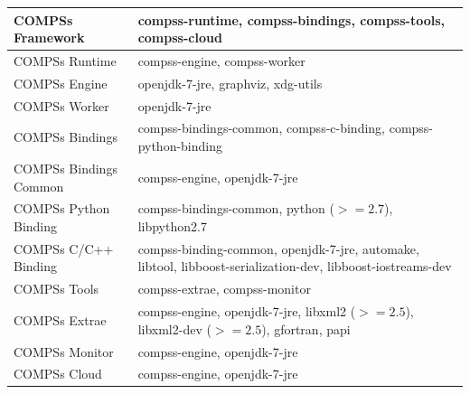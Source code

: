 \bgroup
  \def\arraystretch{1.5}
  \begin{center}
    \begin{tabular}{ p{6cm} | p{10cm} }
    COMPSs Framework 		& compss-runtime, compss-bindings, compss-tools, compss-cloud \\ \hline 
    COMPSs Runtime 		& compss-engine, compss-worker \\ \hline  
    COMPSs Engine 		& openjdk-7-jre, graphviz, xdg-utils \\ \hline 
    COMPSs Worker 		& openjdk-7-jre \\ \hline 
    COMPSs Bindings 		& compss-bindings-common, compss-c-binding, compss-python-binding \\ \hline 
    COMPSs Bindings Common 	& compss-engine, openjdk-7-jre \\ \hline 
    COMPSs Python Binding 	& compss-bindings-common, python ($>= 2.7$), libpython2.7 \\ \hline 
    COMPSs C/C++ Binding 	& compss-binding-common, openjdk-7-jre, automake, libtool, libboost-serialization-dev, libboost-iostreams-dev \\ \hline 
    COMPSs Tools 		& compss-extrae, compss-monitor \\ \hline 
    COMPSs Extrae 		& compss-engine, openjdk-7-jre, libxml2 ($>= 2.5$), libxml2-dev ($>= 2.5$), gfortran, papi \\ \hline 
    COMPSs Monitor 		& compss-engine, openjdk-7-jre \\ \hline 
    COMPSs Cloud 		& compss-engine, openjdk-7-jre    
    \end{tabular}
  \end{center}
\egroup